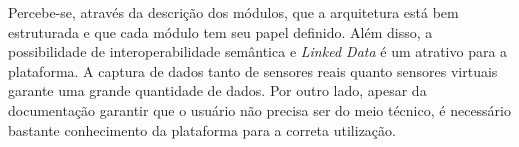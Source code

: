 Percebe-se, através da descrição dos módulos, que a arquitetura está bem
estruturada e que cada módulo tem seu papel definido. Além disso, a
possibilidade de interoperabilidade semântica e \textit{Linked Data} é um
atrativo para a plataforma. A captura de dados tanto de sensores reais quanto
sensores virtuais garante uma grande quantidade de dados. Por outro lado,
apesar da documentação garantir que o usuário não precisa ser do meio técnico,
é necessário bastante conhecimento da plataforma para a correta utilização. 























